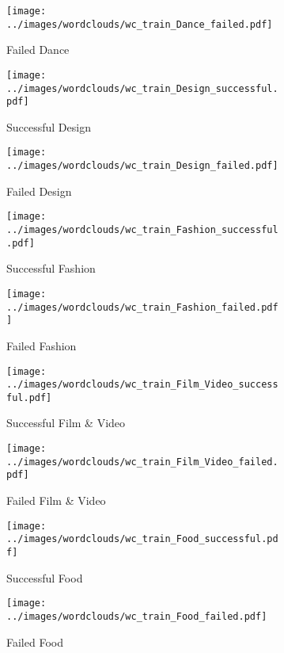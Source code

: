 \documentclass{article}
\begin{document}
\begin{itemize}
\begin{figure}
\begin{subfigure}[d']{0.2\linewidth}
    \centering\texttt{[image: ../images/wordclouds/wc\_train\_Dance\_failed.pdf]}
    \caption{Failed Dance}
    \label{fig:Dance_f}
   \end{subfigure}
    \begin{subfigure}[e]{0.2\linewidth}
    \centering\texttt{[image: ../images/wordclouds/wc\_train\_Design\_successful.pdf]}
    \caption{Successful Design}
    \label{fig:Design_s}
  \end{subfigure} 
  \begin{subfigure}[e']{0.2\linewidth}
    \centering\texttt{[image: ../images/wordclouds/wc\_train\_Design\_failed.pdf]}
    \caption{Failed Design}
    \label{fig:Design_f}
  \end{subfigure} 
    \begin{subfigure}[f]{0.2\linewidth}
    \centering\texttt{[image: ../images/wordclouds/wc\_train\_Fashion\_successful.pdf]}
    \caption{Successful Fashion}
    \label{fig:Fashion_s}
  \end{subfigure} 
  \begin{subfigure}[f']{0.2\linewidth}
    \centering\texttt{[image: ../images/wordclouds/wc\_train\_Fashion\_failed.pdf]}
    \caption{Failed Fashion}
    \label{fig:Fashion_f}
  \end{subfigure}
    \begin{subfigure}[g]{0.2\linewidth}
    \centering\texttt{[image: ../images/wordclouds/wc\_train\_Film\_Video\_successful.pdf]}
    \caption{Successful Film \& Video}
    \label{fig:Film_Video_s}
  \end{subfigure} 
  \begin{subfigure}[g']{0.2\linewidth}
    \centering\texttt{[image: ../images/wordclouds/wc\_train\_Film\_Video\_failed.pdf]}
    \caption{Failed Film \& Video}
    \label{fig:Film_Video_f}
  \end{subfigure}
    \begin{subfigure}[h]{0.2\linewidth}
    \centering\texttt{[image: ../images/wordclouds/wc\_train\_Food\_successful.pdf]}
    \caption{Successful Food}
    \label{fig:Food_s}
  \end{subfigure} 
  \begin{subfigure}[h']{0.2\linewidth}
    \centering\texttt{[image: ../images/wordclouds/wc\_train\_Food\_failed.pdf]}
    \caption{Failed Food}
    \label{fig:Food_f}
  \end{subfigure}
    \begin{subfigure}[i]{0.2\linewidth}

\end{subfigure}
\end{figure}
\end{itemize}
\end{document}
